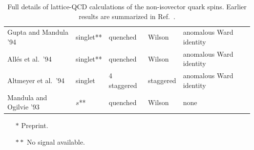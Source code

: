 \begin{table}[t]
{\begin{tabular}{lllll}
  Gupta and Mandula '94 \cite{Gupta:1994qw} &
  singlet** & quenched & Wilson & anomalous Ward identity \\

  Allés et al.\ '94 \cite{Alles:1994ss} &
  singlet** & quenched & Wilson & anomalous Ward identity \\

  Altmeyer et al.\ '94 \cite{Altmeyer:1992nt} &
  singlet & 4 staggered & staggered & anomalous Ward identity \\

  Mandula and Ogilvie '93 \cite{Mandula:1992bc} &
  $s$** & quenched & Wilson & none \\
  \hline
\end{tabular}
} %
\begin{minipage}{\linewidth}
{\footnotesize 
\begin{itemize}
\item[$*$] Preprint.
\item[$**$] No signal available.
\end{itemize}
}
\end{minipage}
\caption{\small Full details of lattice-QCD calculations of the non-isovector quark spins.
  Earlier results are summarized in Ref.~\cite{Liu:1995kb}.
\label{tablenonisovectorquarkspins}
}
\end{table}


